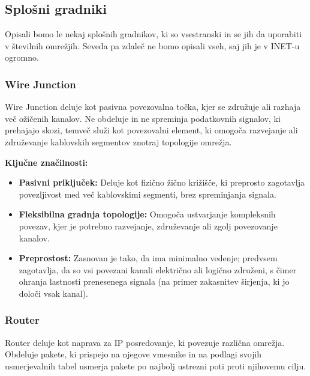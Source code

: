 \subsection{Splošni gradniki}
Opisali bomo le nekaj splošnih gradnikov, ki so vsestranski in se jih da uporabiti v številnih omrežjih. Seveda pa zdaleč ne bomo opisali vseh, saj jih je v INET-u ogromno.
\subsubsection{Wire Junction}

Wire Junction deluje kot pasivna povezovalna točka, kjer se združuje ali razhaja več ožičenih kanalov. Ne obdeluje in ne spreminja podatkovnih signalov, ki prehajajo skozi, temveč služi kot povezovalni element, ki omogoča razvejanje ali združevanje kablovskih segmentov znotraj topologije omrežja.

\vspace{1em}

\noindent\begin{minipage}{\linewidth}
    \textbf{Ključne značilnosti:}
    \begin{itemize}
        \item \textbf{Pasivni priključek:} Deluje kot fizično žično križišče, ki preprosto zagotavlja povezljivost med več kablovskimi segmenti, brez spreminjanja signala.
        \item \textbf{Fleksibilna gradnja topologije:} Omogoča ustvarjanje kompleksnih povezav, kjer je potrebno razvejanje, združevanje ali zgolj povezovanje kanalov.
        \item \textbf{Preprostost:} Zasnovan je tako, da ima minimalno vedenje; predvsem zagotavlja, da so vsi povezani kanali električno ali logično združeni, s čimer ohranja lastnosti prenesenega signala (na primer zakasnitev širjenja, ki jo določi vsak kanal).
    \end{itemize}
\end{minipage}

\subsubsection{Router}
Router deluje kot naprava za IP posredovanje, ki povezuje različna omrežja. Obdeluje pakete, ki prispejo na njegove vmesnike in na podlagi svojih usmerjevalnih tabel usmerja pakete po najbolj ustrezni poti proti njihovemu cilju.

